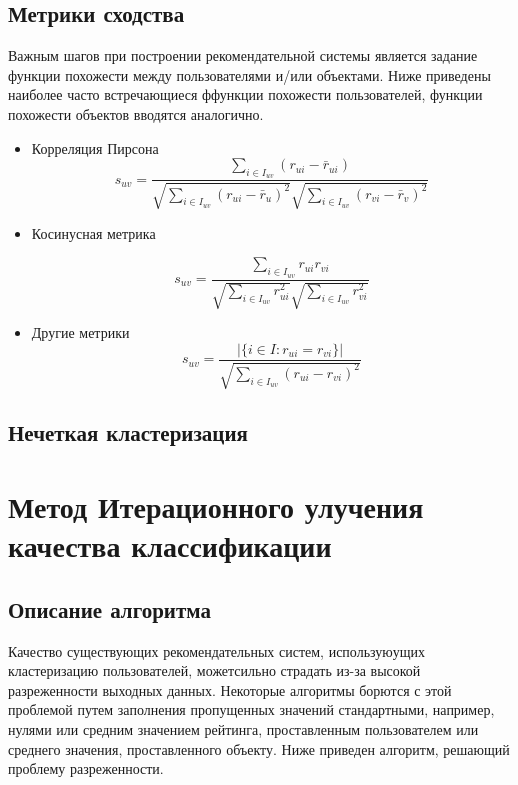 \documentclass[12pt]{article} %
\begin{document}
\subsection{Метрики сходства}
Важным шагов при построении рекомендательной системы является задание функции похожести между пользователями и/или объектами. Ниже приведены наиболее часто встречающиеся ффункции похожести пользователей, функции похожести объектов вводятся аналогично.
\begin{itemize}

\item{Корреляция Пирсона}
\[
s_{uv} = \frac{\sum_{i \in I_{uv}} (r_{ui} - \bar{r}_{ui})}{\sqrt{\sum_{i \in I_{uv}}  (r_{ui} - \bar{r}_{u})^2} \sqrt{\sum_{i \in I_{uv}}  (r_{vi} - \bar{r}_{v})^2}}
\]
\item{Косинусная метрика}

\[
s_{uv} = \frac{\sum_{i \in I_{uv}} r_{ui}r_{vi}} {\sqrt{\sum_{i \in I_{uv}} r_{ui}^2} \sqrt{\sum_{i \in I_{uv}} r_{vi}^2}}
\]

\vspace*{2\baselineskip}
\item{Другие метрики}
\[s_{uv} = \frac{|\{i \in I: r_{ui} = r_{vi}\}|}{\sqrt{\sum_{i \in I_{uv}} (r_{ui} - r_{vi})^2 }}
\]
\end{itemize}
\subsection{Нечеткая кластеризация}



\section{Метод Итерационного улучения качества классификации}
\subsection{Описание алгоритма}
Качество существующих рекомендательных систем, используюущих кластеризацию пользователей, можетсильно страдать из-за высокой разреженности выходных данных. Некоторые алгоритмы борются с этой проблемой путем заполнения пропущенных значений стандартными, например, нулями или средним значением рейтинга, проставленным пользователем или среднего значения, проставленного объекту. Ниже приведен алгоритм, решающий проблему разреженности.
\end{document}
